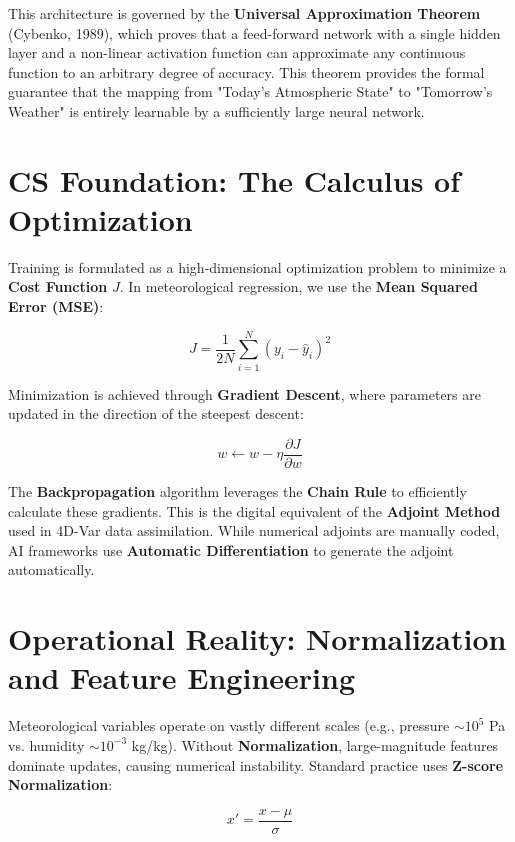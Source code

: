 This architecture is governed by the \textbf{Universal Approximation Theorem} (Cybenko, 1989), which proves that a feed-forward network with a single hidden layer and a non-linear activation function can approximate any continuous function to an arbitrary degree of accuracy. This theorem provides the formal guarantee that the mapping from "Today's Atmospheric State" to "Tomorrow's Weather" is entirely learnable by a sufficiently large neural network. 

\section{CS Foundation: The Calculus of Optimization}

Training is formulated as a high-dimensional optimization problem to minimize a \textbf{Cost Function} $J$. In meteorological regression, we use the \textbf{Mean Squared Error (MSE)}:

\begin{equation}
J = \frac{1}{2N} \sum_{i=1}^{N} (y_i - \hat{y}_i)^2
\end{equation}

Minimization is achieved through \textbf{Gradient Descent}, where parameters are updated in the direction of the steepest descent:

\begin{equation}
w \leftarrow w - \eta \frac{\partial J}{\partial w}
\end{equation}

The \textbf{Backpropagation} algorithm leverages the \textbf{Chain Rule} to efficiently calculate these gradients. This is the digital equivalent of the \textbf{Adjoint Method} used in 4D-Var data assimilation. While numerical adjoints are manually coded, AI frameworks use \textbf{Automatic Differentiation} to generate the adjoint automatically.

\section{Operational Reality: Normalization and Feature Engineering}

Meteorological variables operate on vastly different scales (e.g., pressure $\sim 10^5$ Pa vs. humidity $\sim 10^{-3}$ kg/kg). Without \textbf{Normalization}, large-magnitude features dominate updates, causing numerical instability. Standard practice uses \textbf{Z-score Normalization}:

\begin{equation}
x' = \frac{x - \mu}{\sigma}
\end{equation}

